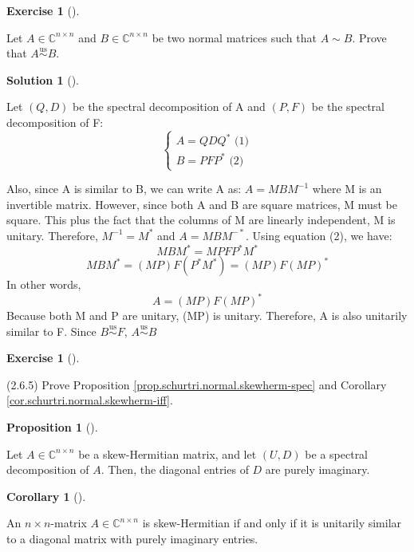 \documentclass[numbers=enddot,12pt,final,onecolumn,notitlepage]{scrartcl}
\newcounter{exer}
\newcounter{sol}
\theoremstyle{definition}
\newtheorem{prop}[theo]{Proposition}
\newenvironment{proposition}[1][]
{\begin{prop}[#1]\begin{leftbar}}
        {\end{leftbar}\end{prop}}
\newtheorem{coro}[theo]{Corollary}
\newenvironment{corollary}[1][]
{\begin{coro}[#1]\begin{leftbar}}
        {\end{leftbar}\end{coro}}
\newtheorem{exmp}[exer]{Exercise}
\newenvironment{exercise}[1][]
{\begin{exmp}[#1]\begin{leftbar}}
        {\end{leftbar}\end{exmp}}
\newtheorem{solu}[sol]{Solution}
\newenvironment{solution}[1][]
{\begin{solu}[#1]\begin{leftbar}}
        {\end{leftbar}\end{solu}}
\begin{document}
\begin{exercise}
	 Let $A\in\mathbb{C}^{n\times n}$ and $B\in\mathbb{C}^{n\times n}$ be
	two normal matrices such that $A\sim B$. Prove that
	$A\overset{\operatorname*{us}}{\sim}B$.
\end{exercise}

\begin{solution}
	Let $(Q, D)$ be the spectral decomposition of A and $(P, F)$ be the spectral decomposition of F:
	\[
		\begin{cases}
			A = QDQ^{\ast} \text{   (1)} \\
			B = PFP^{\ast} \text{   (2)}
		\end{cases}
	\]

	Also, since A is similar to B, we can write A as: $A = MBM^{-1}$ where M is an invertible matrix. However, since both A and B are square matrices, M must be square. This plus the fact that the columns of M are linearly independent, M is unitary. Therefore, $M^{-1} = M^{\ast}$ and $A = MBM^{-\ast}$. Using equation (2), we have:
	\[
		MBM^{\ast} = MPFP^{\ast}M^{\ast}
	\]
	\[
		MBM^{\ast} = (MP)F(P^{\ast}M^{\ast}) = (MP)F(MP)^{\ast}
	\]
	In other words,
	\[
		A = (MP)F(MP)^{\ast}
	\]
	Because both M and P are unitary, (MP) is unitary. Therefore, A is also unitarily similar to F. Since $B \overset{\operatorname*{us}}{\sim} F$, $A \overset{\operatorname*{us}}{\sim} B$

\end{solution}

\begin{exercise}
	\label{exe.schurtri.normal.skewherm} (2.6.5) Prove Proposition
	\ref{prop.schurtri.normal.skewherm-spec} and Corollary
	\ref{cor.schurtri.normal.skewherm-iff}.

	\begin{proposition}
		\label{prop.schurtri.normal.skewherm-spec}Let $A\in\mathbb{C}^{n\times n}$ be
		a skew-Hermitian matrix, and let $\left(  U,D\right)  $ be a spectral
		decomposition of $A$. Then, the diagonal entries of $D$ are purely imaginary.
	\end{proposition}

	\begin{corollary}
		\label{cor.schurtri.normal.skewherm-iff}An $n\times n$-matrix $A\in
			\mathbb{C}^{n\times n}$ is skew-Hermitian if and only if it is unitarily
		similar to a diagonal matrix with purely imaginary entries.
	\end{corollary}
\end{exercise}
\end{document}
